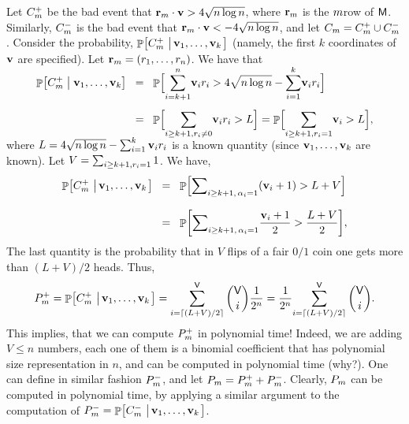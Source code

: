 Let $C_m^+$ be the bad event that
$\mathbf{r}_m \cdot \mathbf{v} > 4 \sqrt{n \log n}$, where $\mathbf{r}_m$ is the
$m$\th row of $\mathsf{M}$.  Similarly, $C_m^-$ is the bad event that
$\mathbf{r}_m \cdot \mathbf{v} < -4 \sqrt{n \log{n}}$, and let
$C_m = C_m^+ \cup C_m^-$.  Consider the probability,
$\Prob{C_\ind^+ \sep{\vecA_1, \ldots, \vecA_k}}$ (namely, the first $k$
coordinates of $\mathbf{v}$ are specified).  Let
$\mathbf{r}_m = ({r}_1,\ldots, {r}_n)$.  We have that
\begin{align*}
    \ProbCond{C_\ind^+ }{\vecA_1, \ldots, \vecA_k}%
    &\EQ
    \Prob{\smash{\sum_{i=k+1}^{n}} \vecA_i \rowc_i > 4 \sqrt{n \log{n}} -
       \smash{\sum_{i=1}^{k}} \vecA_i \rowc_i }%
    \\[0.4cm]&
    \EQ%
    \Prob{\Bigl.\smash{\sum_{i \geq k+1, \rowc_i \ne 0 }} \vecA_i \rowc_i >
       L}%
    =%
    \Prob{\Bigl. \smash{\sum_{i \geq k+1, \rowc_i = 1}} \vecA_i > L},
\end{align*}
where
\begin{math}
    L = 4 \sqrt{n \log{n}} - \sum_{i=1}^{k} \mathbf{v}_i {r}_i
\end{math}
is a known quantity (since $\mathbf{v}_1, \ldots, \mathbf{v}_k$ are known). Let
$V = \sum_{i \geq k+1, {r}_i =1 } 1$. We have,
\begin{align*}
    \Prob{C_\ind^+ \sep{\vecA_1, \ldots, \vecA_k}} 
    &\EQ%
    \Prob{\Bigl. \smash{\displaystyle \sum\nolimits_{{i \geq k+1,\, \alpha_i = 1}} }\pth{ \vecA_i +
          1} > L + V}%
    \\[0.3cm]&%
    \EQ%
    \Prob{\Bigl. \smash{\sum\nolimits_{{i \geq k+1,\, \alpha_i = 1} }}\frac{{ \vecA_i +
             1}}{2} > \frac{L + V}{2}},
\end{align*}
\medskip%
The last quantity is the probability that in $V$ flips of a fair $0/1$
coin one gets more than $(L+V)/2$ heads. Thus,
\begin{equation*}
    P_\ind^+ = \Prob{C_\ind^+ \sep{\vecA_1, \ldots, \vecA_k}}
    =%
    \sum_{i = \ceil{(L+V)/2}}^{\Vertices} \binom{\Vertices}{i}
    \frac{1}{2^n}%
    =%
    \frac{1}{2^n} { \sum_{i = \ceil{(L+V)/2}}^{\Vertices}
       \binom{\Vertices}{i}}.    
\end{equation*}
This implies, that we can compute $P_m^+$ in polynomial
time!  Indeed, we are adding $V \leq n$ numbers, each one of
them is a binomial coefficient that has polynomial size
representation in $n$, and can be computed in polynomial
time (why?).  One can define in similar fashion $P_m^-$, and
let $P_m = P_m^+ + P_m^-$. Clearly, $P_m$ can be computed in
polynomial time, by applying a similar argument to the
computation of $P_\ind^- = \Prob{C_\ind^- \sep{\vecA_1, \ldots,
      \vecA_k}}$.


